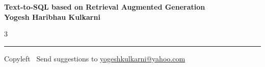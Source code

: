 \documentclass[8pt,landscape]{article}
\begin{document}
\footnotesize


\begin{center}
\Large{\textbf{Text-to-SQL based on Retrieval Augmented Generation\\ Yogesh Haribhau Kulkarni}}
\end{center}

\begin{multicols}{3}

\end{multicols}

\rule{\linewidth}{0.25pt}
\scriptsize
Copyleft \textcopyleft\  Send suggestions to
\href{http://www.yogeshkulkarni.com}{yogeshkulkarni@yahoo.com}
\end{document}
